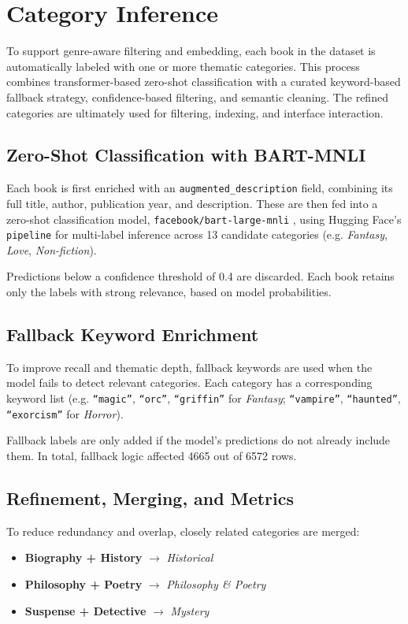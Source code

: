 \chapter{Category Inference}
\label{chapter:category-inference}

To support genre-aware filtering and embedding, each book in the dataset is automatically labeled with one or more thematic categories. 
This process combines transformer-based zero-shot classification with a curated keyword-based fallback strategy, confidence-based filtering, and semantic cleaning. The refined categories are ultimately used for filtering, indexing, and interface interaction.

\section{Zero-Shot Classification with BART-MNLI}
Each book is first enriched with an \texttt{augmented\_description} field, combining its full title, author, publication year, and description. 
These are then fed into a zero-shot classification model, \texttt{facebook/bart-large-mnli} \cite{bart-large-mnli}, using Hugging Face’s \texttt{pipeline} for multi-label inference across 13 candidate categories (e.g. \textit{Fantasy}, \textit{Love}, \textit{Non-fiction}).

Predictions below a confidence threshold of 0.4 are discarded. Each book retains only the labels with strong relevance, based on model probabilities.

\section{Fallback Keyword Enrichment}
To improve recall and thematic depth, fallback keywords are used when the model fails to detect relevant categories. 
Each category has a corresponding keyword list (e.g. \texttt{“magic”}, \texttt{“orc”}, \texttt{“griffin”} for \textit{Fantasy}; \texttt{“vampire”}, \texttt{“haunted”}, \texttt{“exorcism”} for \textit{Horror}).

Fallback labels are only added if the model’s predictions do not already include them. In total, fallback logic affected 4665 out of 6572 rows.

\section{Refinement, Merging, and Metrics}
To reduce redundancy and overlap, closely related categories are merged:
\begin{itemize}
  \item \textbf{Biography + History} $\rightarrow$ \textit{Historical}
  \item \textbf{Philosophy + Poetry} $\rightarrow$ \textit{Philosophy \& Poetry}
  \item \textbf{Suspense + Detective} $\rightarrow$ \textit{Mystery}
\end{itemize}

